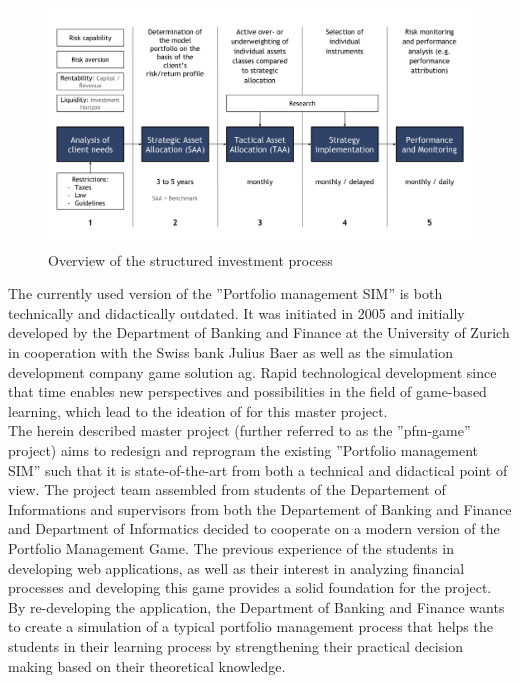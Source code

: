 \begin{figure}[h!]
  \centering
  \includegraphics[scale=0.6]{img/private_banking_process.png}
  \caption{Overview of the structured investment process}
  \label{fig:investment_process}
\end{figure}

The currently used version of the ''Portfolio management SIM'' is both technically and didactically outdated. It was initiated in 2005 and initially developed by the Department of Banking and Finance at the University of Zurich in cooperation with the Swiss bank Julius Baer as well as the simulation development company game solution ag. Rapid technological development since that time enables new perspectives and possibilities in the field of game-based learning, which lead to the ideation of for this master project. \\


The herein described master project (further referred to as the ''pfm-game'' project) aims to redesign and reprogram the existing ''Portfolio management SIM'' such that it is state-of-the-art from both a technical and didactical point of view. The project team assembled from students of the Departement of Informations and supervisors from both the Departement of Banking and Finance and Department of Informatics decided to cooperate on a modern version of the Portfolio Management Game. The previous experience of the students in developing web applications, as well as their interest in analyzing financial processes and developing this game provides a solid foundation for the project. By re-developing the application, the Department of Banking and Finance wants to create a simulation of a typical portfolio management process that helps the students in their learning process by strengthening their practical decision making based on their theoretical knowledge.